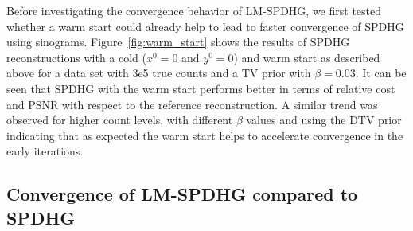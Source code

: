 Before investigating the convergence behavior of LM-SPDHG, we first tested whether 
a warm start could already help to lead to faster convergence of SPDHG using sinograms.
Figure~\ref{fig:warm_start} shows the results of SPDHG reconstructions with a cold 
($x^0 = 0$ and $y^0 = 0$) and warm start as described above for a data set with 3e5 true counts
and a TV prior with $\beta = 0.03$.
It can be seen that SPDHG with the warm start performs better in terms of relative cost
and PSNR with respect to the reference reconstruction.
A similar trend was observed for higher count levels, with different $\beta$ values and using
the DTV prior indicating that as expected the warm start helps to accelerate convergence
in the early iterations.

\subsection*{Convergence of LM-SPDHG compared to SPDHG}

